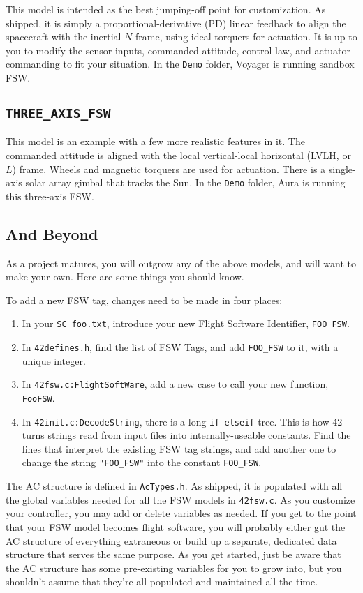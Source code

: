 \documentclass[12pt]{article}
\begin{document}
This model is intended as the best jumping-off point for customization.  As shipped, it is simply a proportional-derivative (PD) linear feedback to align the spacecraft with the inertial $N$ frame, using ideal torquers for actuation.  It is up to you to modify the sensor inputs, commanded attitude, control law, and actuator commanding to fit your situation.  In the {\tt Demo} folder, Voyager is running sandbox FSW.

\subsection{\tt THREE\_AXIS\_FSW}

This model is an example with a few more realistic features in it.  The commanded attitude is aligned with the local vertical-local horizontal (LVLH, or $L$) frame.  Wheels and magnetic torquers are used for actuation.  There is a single-axis solar array gimbal that tracks the Sun.  In the {\tt Demo} folder, Aura is running this three-axis FSW.

\subsection{And Beyond}

As a project matures, you will outgrow any of the above models, and will want to make your own.  Here are some things you should know.

To add a new FSW tag, changes need to be made in four places:
\begin{enumerate}
\item In your {\tt SC\_foo.txt}, introduce your new Flight Software Identifier, {\tt FOO\_FSW}.
\item In {\tt 42defines.h}, find the list of FSW Tags, and add {\tt FOO\_FSW} to it, with a unique integer.
\item In {\tt 42fsw.c:FlightSoftWare}, add a new case to call your new function, {\tt FooFSW}.
\item In {\tt 42init.c:DecodeString}, there is a long {\tt if-elseif} tree.  This is how 42 turns strings read from input files into internally-useable constants.  Find the lines that interpret the existing FSW tag strings, and add another one to change the string {\tt "FOO\_FSW"} into the constant {\tt FOO\_FSW}. 
\end{enumerate}

The AC structure is defined in {\tt AcTypes.h}.  As shipped, it is populated with all the global variables needed for all the FSW models in {\tt 42fsw.c}.  As you customize your controller, you may add or delete variables as needed.  If you get to the point that your FSW model becomes flight software, you will probably either gut the AC structure of everything extraneous or build up a separate, dedicated data structure that serves the same purpose.  As you get started, just be aware that the AC structure has some pre-existing variables for you to grow into, but you shouldn't assume that they're all populated and maintained all the time.
\end{document}
